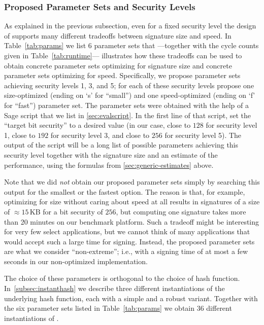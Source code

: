 \subsubsection{Proposed Parameter Sets and Security Levels}
As explained in the previous subsection,
even for a fixed security level the design of \spx supports many different
tradeoffs between signature size and speed. In Table~\ref{tab:params} we list
6 parameter sets that%
---together with the cycle counts given in Table~\ref{tab:runtime}---
illustrates how these tradeoffs can be used to obtain concrete parameter sets
optimizing for signature size and concrete parameter sets optimizing for speed.
Specifically, we propose parameter sets achieving security levels 1, 3, and 5;
for each of these security levels propose one size-optimized (ending on `s'
for ``small'') and one speed-optimized (ending on `f' for ``fast'') parameter
set. The parameter sets were obtained with the help of a Sage script that 
we list in \autoref{sec:evalscript}. In the first line of that script,
set the ``target bit security'' to a desired value (in our case, close to
$128$ for security level 1, close to $192$ for security level 3, and close to $256$
for security level 5). The output of the script will be a long list of possible
parameters achieving this security level together with the signature size and
an estimate of the performance, using the formulas from 
\autoref{sec:generic-estimates} above.

Note that we did \emph{not} obtain our proposed parameter sets simply by searching
this output for the smallest or the fastest option. The reason is that, for example,
optimizing for size without caring about speed at all results in signatures of 
a size of $\approx15$\,KB for a bit security of $256$, but computing one signature
takes more than 20 minutes on our benchmark platform. Such a tradeoff might be
interesting for very few select applications, but we cannot think of many applications
that would accept such a large time for signing. Instead, the proposed parameter
sets are what we consider ``non-extreme''; i.e., with a signing time of at most
a few seconds in our non-optimized implementation.

The choice of these parameters is orthogonal to the choice of hash function.
In~\autoref{subsec:instanthash} we describe three different instantiations
of the underlying hash function, each with a simple and a robust variant.
Together with the six parameter sets listed in 
Table~\ref{tab:params} we obtain 36 different instantiations of \spx.

